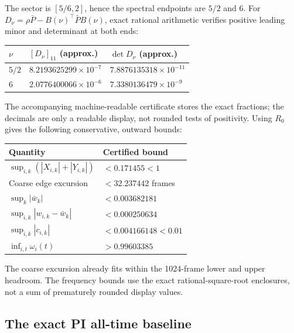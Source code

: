 The sector is $[5/6,2]$, hence the spectral endpoints are $5/2$ and 6.
For $D_\nu=\rho\bar P-B(\nu)^\top\bar P B(\nu)$, exact rational
arithmetic verifies positive leading minor and determinant at both ends:
\begin{center}\small
\begin{tabular}{@{}lll@{}}\toprule
$\nu$ & $[D_\nu]_{11}$ (approx.) & $\det D_\nu$ (approx.)\\\midrule
$5/2$ & $8.2193625299\times10^{-7}$ & $7.8876135318\times10^{-11}$\\
$6$ & $2.0776400066\times10^{-6}$ & $7.3380136479\times10^{-9}$\\
\bottomrule\end{tabular}\end{center}
The accompanying machine-readable certificate stores the exact fractions;
the decimals are only a readable display, not rounded tests of positivity.
Using $R_0$ gives the following conservative, outward bounds:
\begin{center}\small
\begin{tabular}{@{}ll@{}}\toprule
Quantity & Certified bound\\\midrule
$\sup_{i,k}(|X_{i,k}|+|Y_{i,k}|)$ & $<0.171455<1$\\
Coarse edge excursion & $<32.237442$ frames\\
$\sup_k|\bar w_k|$ & $<0.003682181$\\
$\sup_{i,k}|w_{i,k}-\bar w_k|$ & $<0.000250634$\\
$\sup_{i,k}|c_{i,k}|$ & $<0.004166148<0.01$\\
$\inf_{i,t}\omega_i(t)$ & $>0.99603385$\\
\bottomrule\end{tabular}\end{center}
The coarse excursion already fits within the 1024-frame lower and upper
headroom. The frequency bounds use the exact rational-square-root
enclosures, not a sum of prematurely rounded display values.

\subsection{The exact PI all-time baseline}

